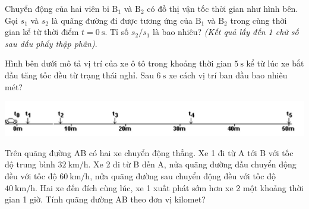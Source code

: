 \begin{ex}
	Chuyển động của hai viên bi $\mathrm{B}_1$ và $\mathrm{B}_2$ có đồ thị vận tốc thời gian như hình bên. Gọi $s_1$ và $s_2$ là quãng đường đi được tương ứng của $\mathrm{B}_1$ và $\mathrm{B}_2$ trong cùng thời gian kể từ thời điểm $t=\SI{0}{\second}$. Tỉ số $s_2/s_1$ là bao nhiêu? \textit{(Kết quả lấy đến 1 chữ số sau dấu phẩy thập phân)}.
	\begin{center}
	\end{center}
\end{ex}
\begin{ex}
	Hình bên dưới mô tả vị trí của xe ô tô trong khoảng thời gian $\SI{5}{\second}$ kể từ lúc xe bắt đầu tăng tốc đều từ trạng thái nghỉ. Sau $\SI{6}{\second}$ xe cách vị trí ban đầu bao nhiêu mét?
	\begin{center}
		\includegraphics[width=0.8\linewidth]{../figs/D10-2-14}
	\end{center}
	\loigiai{
		
	}
\end{ex}
\begin{ex}
Trên quãng đường AB có hai xe chuyển động thẳng. Xe 1 đi từ A tới B với tốc độ trung bình $\SI{32}{\kilo\meter/\hour}$. Xe 2 đi từ B đến A, nửa quãng đường đầu chuyển động đều với tốc độ $\SI{60}{\kilo\meter/\hour}$, nửa quãng đường sau chuyển động đều với tốc độ $\SI{40}{\kilo\meter/\hour}$. Hai xe đến đích cùng lúc, xe 1 xuất phát sớm hơn xe 2 một khoảng thời gian 1 giờ. Tính quãng đường AB theo đơn vị kilomet?
	\loigiai{
		
	}
\end{ex}
